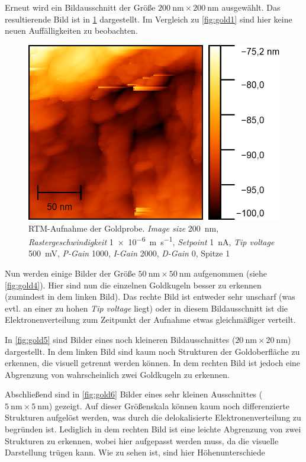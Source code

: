 Erneut wird ein Bildausschnitt der Größe $\SI{200}{\nano \meter} \times \SI{200}{\nano \meter}$ ausgewählt. Das resultierende Bild ist in \cref{fig:gold3}
dargestellt. Im Vergleich zu \cref{fig:gold1} sind hier keine neuen Auffälligkeiten zu beobachten.
\begin{figure}[H]
	\centering
	\includegraphics[width=0.6\linewidth]{../figs/Gold10468.png}
	\caption{RTM-Aufnahme der Goldprobe. \textit{Image size} \SI{200}{\nano \meter}, \textit{Rastergeschwindigkeit} \SI{1e-6}{\meter \per \second}, \textit{Setpoint} \SI{1}{\nano \ampere},
    \textit{Tip voltage} \SI{500}{\milli \volt}, \textit{P-Gain} \num{1000}, \textit{I-Gain} \num{2000}, \textit{D-Gain} \num{0}, Spitze 1}
	\label{fig:gold3}
\end{figure} Nun werden einige Bilder der Größe $\SI{50}{\nano \meter} \times \SI{50}{\nano \meter}$ aufgenommen (siehe \cref{fig:gold4}). Hier sind nun die einzelnen Goldkugeln
besser zu erkennen (zumindest in dem linken Bild). Das rechte Bild ist entweder sehr unscharf (was evtl. an einer zu hohen \textit{Tip voltage} liegt) oder in diesem Bildausschnitt
ist die Elektronenverteilung zum Zeitpunkt der Aufnahme etwas gleichmäßiger verteilt.\par
In \cref{fig:gold5} sind Bilder eines noch kleineren Bildausschnittes ($\SI{20}{\nano \meter} \times \SI{20}{\nano \meter}$) dargestellt. In dem linken Bild sind kaum noch Strukturen der
Goldoberfläche zu erkennen, die visuell getrennt werden können. In dem rechten Bild ist jedoch eine Abgrenzung von wahrscheinlich zwei Goldkugeln zu erkennen.\par
Abschließend sind in \cref{fig:gold6} Bilder eines sehr kleinen Ausschnittes ($\SI{5}{\nano \meter} \times \SI{5}{\nano \meter}$) gezeigt. Auf dieser Größenskala
können kaum noch differenzierte Strukturen aufgelöst werden, was durch die delokalisierte Elektronenverteilung zu begründen ist. Lediglich in dem rechten Bild ist eine leichte
Abgrenzung von zwei Strukturen zu erkennen, wobei hier aufgepasst werden muss, da die visuelle Darstellung trügen kann. Wie zu sehen ist, sind hier Höhenunterschiede
